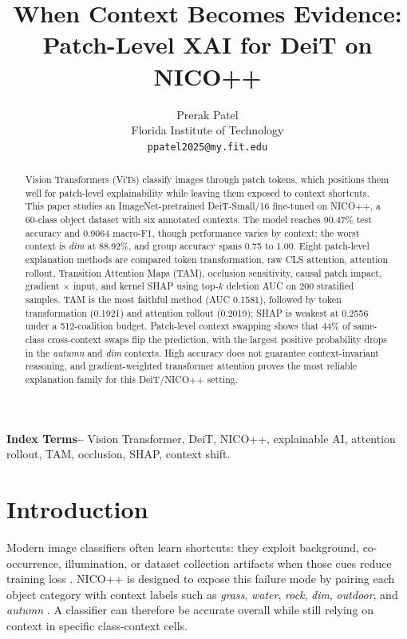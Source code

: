 \documentclass[10pt]{article}
\title{\vspace{-0.25in}\bfseries When Context Becomes Evidence: Patch-Level XAI for DeiT on NICO++}
\author{Prerak Patel\\
Florida Institute of Technology\\
\texttt{ppatel2025@my.fit.edu}}
\date{}
\begin{document}
\maketitle

\begin{abstract}
Vision Transformers (ViTs) classify images through patch tokens, which positions them well for patch-level explainability while leaving them exposed to context shortcuts. This paper studies an ImageNet-pretrained DeiT-Small/16 fine-tuned on NICO++, a 60-class object dataset with six annotated contexts. The model reaches 90.47\% test accuracy and 0.9064 macro-F1, though performance varies by context: the worst context is \emph{dim} at 88.92\%, and group accuracy spans 0.75 to 1.00. Eight patch-level explanation methods are compared token transformation, raw CLS attention, attention rollout, Transition Attention Maps (TAM), occlusion sensitivity, causal patch impact, gradient $\times$ input, and kernel SHAP using top-$k$ deletion AUC on 200 stratified samples. TAM is the most faithful method (AUC 0.1581), followed by token transformation (0.1921) and attention rollout (0.2019); SHAP is weakest at 0.2556 under a 512-coalition budget. Patch-level context swapping shows that 44\% of same-class cross-context swaps flip the prediction, with the largest positive probability drops in the \emph{autumn} and \emph{dim} contexts. High accuracy does not guarantee context-invariant reasoning, and gradient-weighted transformer attention proves the most reliable explanation family for this DeiT/NICO++ setting.
\end{abstract}

\noindent\textbf{Index Terms--} Vision Transformer, DeiT, NICO++, explainable AI, attention rollout, TAM, occlusion, SHAP, context shift.

\section{Introduction}
Modern image classifiers often learn shortcuts: they exploit background, co-occurrence, illumination, or dataset collection artifacts when those cues reduce training loss \cite{geirhos2020shortcut}. NICO++ is designed to expose this failure mode by pairing each object category with context labels such as \emph{grass}, \emph{water}, \emph{rock}, \emph{dim}, \emph{outdoor}, and \emph{autumn} \cite{zhang2023nico}. A classifier can therefore be accurate overall while still relying on context in specific class-context cells.
\end{document}
